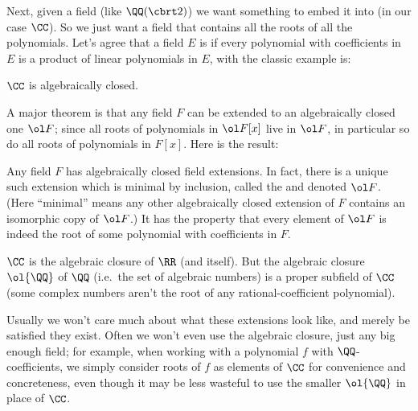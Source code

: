 Next, given a field (like $\QQ(\cbrt2)$)
we want something to embed it into (in our case $\CC$).
So we just want a field that contains all the roots of all the polynomials.
Let's agree that a field $E$ is  if every polynomial
with coefficients in $E$ is a product of linear polynomials in $E$,
with the classic example is:
\begin{example}
	[$\CC$]
	$\CC$ is algebraically closed.
\end{example}
A major theorem is that any field $F$ can be extended to an algebraically closed one
$\ol F$; since all roots of polynomials in $\ol F[x]$ live in $\ol F$,
in particular so do all roots of polynomials in $F[x]$.
Here is the result:
\begin{theorem}
	Any field $F$ has algebraically closed field extensions.
	In fact, there is a unique such extension which is minimal by inclusion,
	called the  and denoted $\ol F$.
	(Here ``minimal'' means any other algebraically closed extension of $F$
	contains an isomorphic copy of $\ol F$.)
	It has the property that every element of $\ol F$ is indeed the root
	of some polynomial with coefficients in $F$.
\end{theorem}
\begin{example}
	[$\ol{\RR} = \ol{\CC} = \CC \supsetneq \ol{\QQ}$]
	$\CC$ is the algebraic closure of $\RR$ (and itself).
	But the algebraic closure $\ol{\QQ}$ of $\QQ$ (i.e.\ the set of algebraic numbers)
	is a proper subfield of $\CC$
	(some complex numbers aren't the root of any rational-coefficient polynomial).
\end{example}
Usually we won't care much about what these extensions look like,
and merely be satisfied they exist.
Often we won't even use the algebraic closure, just any big enough field;
for example, when working with a polynomial $f$ with $\QQ$-coefficients,
we simply consider roots of $f$ as elements of $\CC$ for convenience and concreteness,
even though it may be less wasteful to use the smaller $\ol{\QQ}$ in place of $\CC$.


